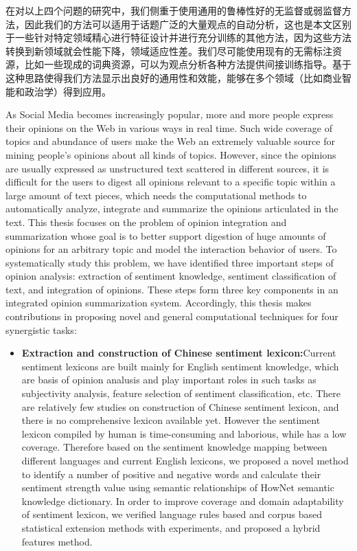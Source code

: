 \begin{cabstract}
在对以上四个问题的研究中，我们侧重于使用通用的鲁棒性好的无监督或弱监督方法，因此我们的方法可以适用于话题广泛的大量观点的自动分析，这也是本文区别于一些针对特定领域精心进行特征设计并进行充分训练的其他方法，因为这些方法转换到新领域就会性能下降，领域适应性差。我们尽可能使用现有的无需标注资源，比如一些现成的词典资源，可以为观点分析各种方法提供间接训练指导。基于这种思路使得我们方法显示出良好的通用性和效能，能够在多个领域（比如商业智能和政治学）得到应用。


\end{cabstract}

\begin{eabstract}

As Social Media becomes increasingly popular, more and more people express their opinions on the Web in various ways in real time. Such wide coverage of topics and abundance of users make the Web an extremely valuable source for mining people's opinions about all kinds of topics. However, since the opinions are usually expressed as unstructured text scattered in different sources, it is difficult for the users to digest all opinions relevant to a specific topic within a large amount of text pieces, which needs the computational methods to automatically analyze, integrate and summarize the opinions articulated in the text. This thesis focuses on the problem of opinion integration and summarization whose goal is to better support digestion of huge amounts of opinions for an arbitrary topic and model the interaction behavior of users. To systematically study this problem, we have identified three important steps of opinion analysis: extraction of sentiment knowledge, sentiment classification of text, and integration of opinions. These steps form three key components in an integrated opinion summarization system. Accordingly, this thesis makes contributions in proposing novel and general computational techniques for four synergistic tasks: 
\begin{itemize}
\item \textbf{Extraction and construction of Chinese sentiment lexicon:}Current sentiment lexicons are built mainly for English sentiment knowledge, which are basis of opinion analusis and play important roles in such tasks as subjectivity analysis, feature selection of sentiment classification, etc. There are relatively few studies on construction of Chinese sentiment lexicon, and there is no comprehensive lexicon available yet. However the sentiment lexicon compiled by human is time-consuming and laborious, while has a low coverage. Therefore based on the sentiment knowledge mapping between different languages and current English lexicons, we proposed a novel method to identify a number of positive and negative words and calculate their sentiment strength value using semantic relationships of HowNet semantic knowledge dictionary. In order to improve coverage and domain adaptability of sentiment lexicon, we verified language rules based and corpus based statistical extension methods with experiments, and proposed a hybrid features method.

\end{itemize}
\end{eabstract}
